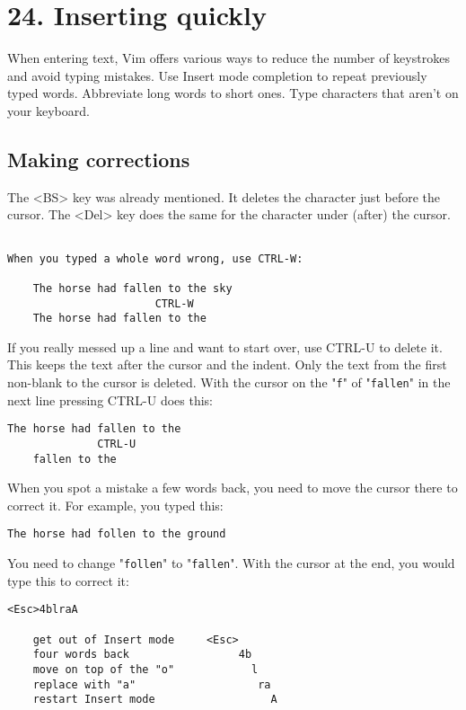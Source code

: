 \section{24. Inserting quickly}
When entering text, Vim offers various ways to reduce the number of keystrokes and avoid typing mistakes.
Use Insert mode completion to repeat previously typed words.
Abbreviate long words to short ones.
Type characters that aren't on your keyboard.
\subsection{Making corrections}
The <BS> key was already mentioned.
It deletes the character just before the cursor.
The <Del> key does the same for the character under (after) the cursor.

\begin{Verbatim}[samepage=true]

When you typed a whole word wrong, use CTRL-W:

    The horse had fallen to the sky 
                       CTRL-W
    The horse had fallen to the 
\end{Verbatim}

If you really messed up a line and want to start over, use CTRL-U to delete it.
This keeps the text after the cursor and the indent.
Only the text from the first non-blank to the cursor is deleted.
With the cursor on the "\verb!f!" of "\verb!fallen!" in the next line pressing CTRL-U does this:

\begin{Verbatim}[samepage=true]
    The horse had fallen to the 
              CTRL-U
    fallen to the 
\end{Verbatim}

When you spot a mistake a few words back, you need to move the cursor there to correct it.
For example, you typed this:

\begin{Verbatim}[samepage=true]
    The horse had follen to the ground 
\end{Verbatim}

You need to change "\verb!follen!" to "\verb!fallen!".
With the cursor at the end, you would type this to correct it:

\begin{Verbatim}[samepage=true]
                               <Esc>4blraA

    get out of Insert mode     <Esc>
    four words back                 4b
    move on top of the "o"            l
    replace with "a"                   ra
    restart Insert mode                  A
\end{Verbatim}

